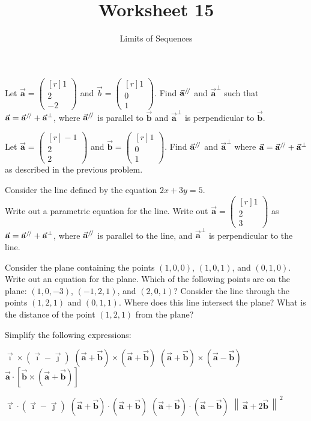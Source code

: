 \documentclass[paper=letter, 11pt]{article}
\title{Worksheet 15}
\subtitle{Limits of Sequences}
\newcommand*{\vek}{\begin{pmatrix*}[r]}
\newcommand*{\tor}{\end{pmatrix*}}
\renewcommand{\v}[1]{\vec{\mathbf{#1}}}
\renewcommand*{\ll}{/\kern-0.15em/}
\begin{document}
\maketitle

\Prob Let $\v{a} = \vek 1 \\ 2 \\ -2 \tor$ and $\vec{b} = \vek 1 \\ 0 \\ 1 \tor$.
Find $\v{a}^{\ll}$ and $\v{a}^{\perp}$ such that $\v{a} = \v{a}^{\ll} + \v{a}^{\perp}$,
where $\v{a}^{\ll}$ is parallel to $\v{b}$ and $\v{a}^{\perp}$ is perpendicular to $\v{b}$.

\vfil\vfil

\Prob Let $\v{a} = \vek -1 \\ 2 \\ 2 \tor$ and $\v{b} = \vek 1 \\ 0 \\ 1 \tor$.
Find $\v{a}^{\ll}$ and $\v{a}^{\perp}$ where $\v{a} = \v{a}^{\ll} + \v{a}^{\perp}$
as described in the previous problem.

\vfil\vfil

\Prob Consider the line defined by the equation $2x + 3y = 5$.\\

\subprob Write out a parametric equation for the line.\vfil
\subprob Write out $\v{a} = \vek 1 \\ 2 \\ 3 \tor$ as $\v{a} = \v{a}^{\ll} + \v{a}^{\perp}$,
where $\v{a}^{\ll}$ is parallel to the line, and $\v{a}^{\perp}$ is perpendicular to the line.
\vfil\vfil

\newpage

\Prob Consider the plane containing the points $(1,0,0)$, $(1,0,1)$, and $(0,1,0)$.\\

\subprob Write out an equation for the plane.\vfill
\subprob Which of the following points are on the plane: $(1, 0, -3)$, $(-1, 2, 1)$,
and $(2, 0, 1)$?\vfill
\subprob Consider the line through the points $(1,2,1)$ and $(0,1,1)$.  Where does this line intersect the plane?\vfill
\subprob What is the distance of the point $(1,2,1)$ from the plane?\vfill

\newpage

\Prob Simplify the following expressions:


\begin{multicols}{2}
    \subprob $\v{\imath} \times (\v{\imath} - \v{\jmath})$  \vskip2cm
    \subprob $(\v{a} + \v{b}) \times (\v{a} + \v{b})$ \vskip2cm
    \subprob $(\v{a} + \v{b}) \times (\v{a} - \v{b})$ \vskip2cm
    \subprob $\v{a} \cdot \left[\v{b} \times \left(\v{a} + \v{b}\right) \right]$ \vskip2cm

    \columnbreak

    \subprob $\v{\imath} \cdot (\v{\imath} - \v{\jmath})$ \vskip2cm
    \subprob $(\v{a} + \v{b}) \cdot (\v{a} + \v{b})$ \vskip2cm
    \subprob $(\v{a} + \v{b}) \cdot (\v{a} - \v{b})$ \vskip2cm
    \subprob ${\left\|\,\v{a} + 2\v{b}\,\right\|}^{\,2}$
\end{multicols}
\vskip2.5cm
\end{document}
